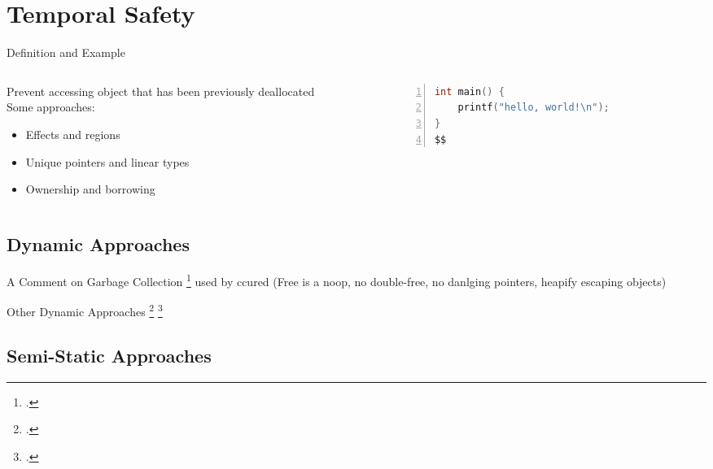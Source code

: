 \documentclass[aspectratio=169]{beamer}
\begin{document}
\section{Temporal Safety}

\begin{frame}[fragile]{Definition and Example}
  \footnotesize
  \begin{columns}[T]
    \begin{column}{0.45\textwidth}
        Prevent accessing object that has been previously deallocated
        \\
        Some approaches:
        \begin{itemize}
            \item Effects and regions
            \item Unique pointers and linear types
            \item Ownership and borrowing
        \end{itemize}
    \end{column}
    \begin{column}{0.45\textwidth}
%      
       \begin{lstlisting}[language=C,numbers=left,mathescape,basicstyle={\footnotesize\ttfamily}]
int main() {
    printf("hello, world!\n");
}
$$
        \end{lstlisting}
    \end{column}
  \end{columns}
\end{frame}

\subsection{Dynamic Approaches}
\begin{frame}{A Comment on Garbage Collection}
    \footcite{boehm_garbage_1988}
    used by ccured (Free is a noop, no double-free, no danlging pointers, heapify escaping objects)
\end{frame}
\begin{frame}{Other Dynamic Approaches}
    \footcite{austin_efficient_1994}
    \footcite{west_cuckoo:_2005}
\end{frame}

\subsection{Semi-Static Approaches}
\end{document}
